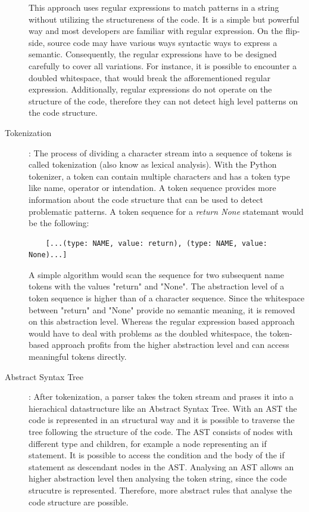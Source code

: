 \begin{description}
    This approach uses  regular expressions to match patterns in a string without utilizing the structureness of the code. It is a simple but powerful way and most developers are familiar with regular expression. On the flip-side, source code may have various ways syntactic ways to express a semantic. Consequently, the regular expressions have to be designed carefully to cover all variations. For instance, it is possible to encounter a doubled whitespace, that would break the afforementioned regular expression. Additionally, regular expressions do not operate on the structure of the code, therefore they can not detect high level patterns on the code structure.
    \item[Tokenization]: The process of dividing a character stream into a sequence of tokens is called tokenization (also know as lexical analysis). With the Python tokenizer, a token can contain multiple characters and has a token type like name, operator or intendation. A token sequence provides more information about the code structure that can be used to detect problematic patterns. 
    A token sequence for a \textit{return None} statemant would be the following: 
    \begin{lstlisting}
    [...(type: NAME, value: return), (type: NAME, value: None)...]
    \end{lstlisting}
    A simple algorithm would scan the sequence for two subsequent name tokens with the values "return" and "None". The abstraction level of a token sequence is higher than of a character sequence. Since the whitespace between "return" and "None" provide no semantic meaning, it is removed on this abstraction level. Whereas the regular expression based approach would have to deal with problems as the doubled whitespace, the token-based approach profits from the higher abstraction level and can access meaningful tokens directly.
    \item[Abstract Syntax Tree]: After tokenization, a parser takes the token stream and prases it into a hierachical datastructure like an Abstract Syntax Tree. With an AST the code is represented in an structural way and it is possible to traverse the tree following the structure of the code. The AST consists of nodes with different type and children, for example a node representing an if statement. It is possible to access the condition and the body of the if statement as descendant nodes in the AST. Analysing an AST allows an higher abstraction level then analysing the token string, since the  code strucutre is represented. Therefore, more abstract rules that analyse the code structure are possible.


\end{description}

